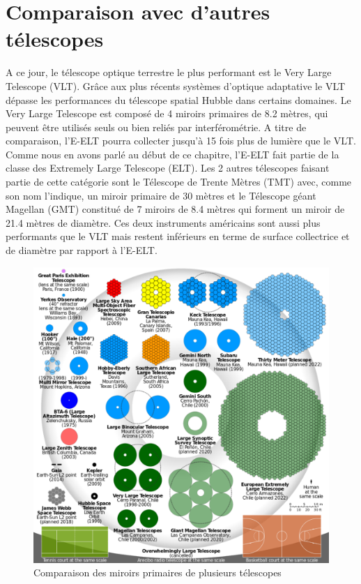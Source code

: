 \section{Comparaison avec d'autres télescopes}\label{4.3}

A ce jour, le télescope optique terrestre le plus performant est le Very Large Telescope (VLT). Grâce aux plus récents systèmes d'optique adaptative le VLT dépasse les performances du télescope spatial Hubble dans certains domaines. Le Very Large Telescope est composé de 4 miroirs primaires de 8.2 mètres, qui peuvent être utilisés seuls ou bien reliés par interférométrie.  A titre de comparaison, l'E-ELT pourra collecter jusqu'à 15 fois plus de lumière que le VLT. Comme nous en avons parlé au début de ce chapitre, l'E-ELT fait partie de la classe des Extremely Large Telescope (ELT). Les 2 autres télescopes faisant partie de cette catégorie sont le Télescope de Trente Mètres (TMT) avec, comme son nom l'indique, un miroir primaire de 30 mètres et le Télescope géant Magellan (GMT) constitué de 7 miroirs de 8.4 mètres qui forment un miroir de 21.4 mètres de diamètre. Ces deux instruments américains sont aussi plus performants que le VLT mais restent inférieurs en terme de surface collectrice et de diamètre par rapport à l'E-ELT.  

\begin{figure}[H]
	\centering
	\includegraphics[scale=0.2]{images/comp_tscp}
	\caption[Comparaison des miroirs primaires de plusieurs télescopes]{Comparaison des miroirs primaires de plusieurs télescopes}
	\label{Fig. 4.2}
\end{figure}

